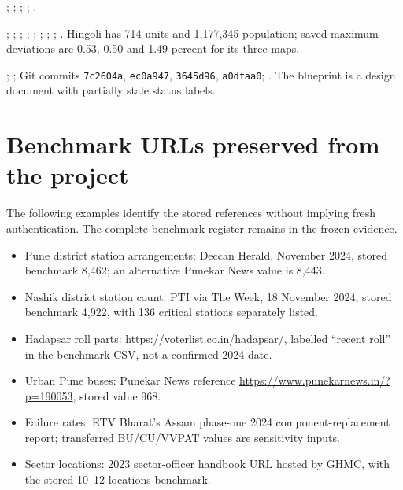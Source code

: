 \documentclass[11pt,a4paper,oneside]{report}
\begin{document}
\begin{description}[style=nextline]
\item[{[S14] PC grouping}] ; ; ; ; .
\item[{[S15] Wrappers, tests and showcase}] ; ; ; ; ; ; ; ; . Hingoli has 714 units and 1,177,345 population; saved maximum deviations are 0.53, 0.50 and 1.49 percent for its three maps.
\item[{[S16] Intent and repository state}] ; ; Git commits \texttt{7c2604a}, \texttt{ec0a947}, \texttt{3645d96}, \texttt{a0dfaa0}; . The blueprint is a design document with partially stale status labels.
\end{description}

\endgroup
\section{Benchmark URLs preserved from the project}
The following examples identify the stored references without implying fresh authentication. The complete benchmark register remains in the frozen evidence.
\begin{itemize}
\item Pune district station arrangements: Deccan Herald, November 2024, stored benchmark 8,462; an alternative Punekar News value is 8,443.
\item Nashik district station count: PTI via The Week, 18 November 2024, stored benchmark 4,922, with 136 critical stations separately listed.
\item Hadapsar roll parts: \url{https://voterlist.co.in/hadapsar/}, labelled ``recent roll'' in the benchmark CSV, not a confirmed 2024 date.
\item Urban Pune buses: Punekar News reference \url{https://www.punekarnews.in/?p=190053}, stored value 968.
\item Failure rates: ETV Bharat's Assam phase-one 2024 component-replacement report; transferred BU/CU/VVPAT values are sensitivity inputs.
\item Sector locations: 2023 sector-officer handbook URL hosted by GHMC, with the stored 10--12 locations benchmark.
\end{itemize}
\end{document}
